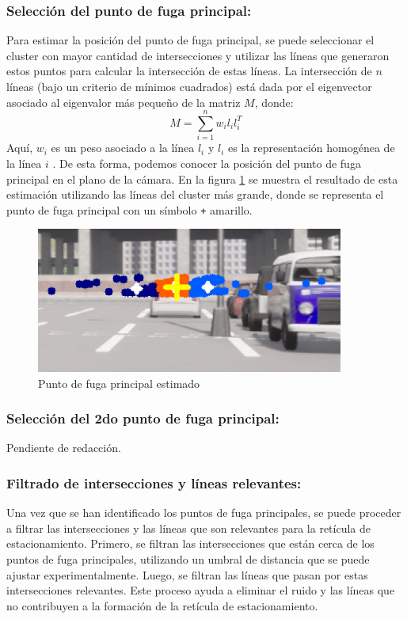 \subsubsection{Selección del punto de fuga principal:}
\noindent
Para estimar la posición del punto de fuga principal, se puede seleccionar el cluster con mayor cantidad de intersecciones y
utilizar las líneas que generaron estos puntos para calcular la intersección de estas líneas.
La intersección de $n$ líneas (bajo un criterio de mínimos cuadrados) está dada por
el eigenvector asociado al eigenvalor más pequeño de la matriz $M$, donde:
\[
    M = \sum_{i=1}^{n} w_i l_i l_i^T
\]
Aquí, $w_i$ es un peso asociado a la línea $l_i$ y $l_i$ es la representación homogénea de la línea $i$ \cite{kanatani1998statistical}.
De esta forma, podemos conocer la posición del punto de fuga principal en el plano de la cámara.
En la figura \ref{fig:vanishingPoint} se muestra el resultado de esta estimación utilizando las líneas del cluster más grande, donde se
representa el punto de fuga principal con un símbolo \texttt{+} amarillo.
\begin{figure}[!ht]
    \centering
    \includegraphics[width=0.9\textwidth]{img/reticule/vanishingPoint}
    \caption{Punto de fuga principal estimado}
    \label{fig:vanishingPoint}
\end{figure}

\subsubsection{Selección del 2do punto de fuga principal:}
Pendiente de redacción.

\subsubsection{Filtrado de intersecciones y líneas relevantes:}
\noindent
Una vez que se han identificado los puntos de fuga principales, se puede proceder a filtrar las intersecciones y las líneas que son
relevantes para la retícula de estacionamiento.
Primero, se filtran las intersecciones que están cerca de los puntos de fuga principales, utilizando un umbral de distancia que se puede ajustar experimentalmente.
Luego, se filtran las líneas que pasan por estas intersecciones relevantes.
Este proceso ayuda a eliminar el ruido y las líneas que no contribuyen a la formación de la retícula de estacionamiento.


